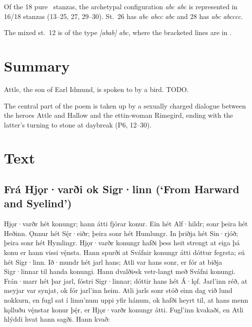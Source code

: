 Of the 18 pure \Ljodahattr\ stanzas, the archetypal configuration \emph{abc abc} is represented in 16/18 stanzas (13--25, 27, 29--30).  St.~26 has \emph{abc abcc abc} and 28 has \emph{abc abcccc}.

The mixed st.~12 is of the type \emph{[abab] abc}, where the bracketed lines are in \Fornyrdislag.

\section{Summary}

Attle, the son of Earl Idmund, is spoken to by a bird.  TODO.

The central part of the poem is taken up by a sexually charged dialogue between the heroes Attle and Hallow and the ettin-woman Rimegird, ending with the latter’s turning to stone at daybreak (P6, 12--30).

\sectionline

\newpage

\section{Text}

\subsection{Frá Hjǫr·varði ok Sigr·linn (‘From Harward and Syelind’)}

\bpg\bpa{}%
Hjǫr·varðr hét konungr; hann átti fjórar konur.  Ein hét Alf·hildr; sonr þeira hét Heðinn.  Ǫnnur hét Sę́r·eiðr; þeira sonr hét Humlungr.  In þriðja hét Sin·rjóð; þeira sonr hét Hymlingr.  Hjǫr·varðr konungr hafði þess heit strengt at eiga þá konu er hann vissi vę́nsta.  Hann spurði at Sváfnir konungr átti dóttur  fegrsta; sú hét Sigr·linn.  Ið·mundr hét jarl hans; Atli var hans sonr, er fór at biðja Sigr·linnar til handa konungi.  Hann dvalði⸗sk vetr-langt með Sváfni konungi.  Frán·marr hét þar jarl, fóstri Sigr·linnar; dóttir hans hét Á·lǫf.  Jarl’inn réð, at meyjar var synjat, ok fór jarl’inn heim.  Atli jarls sonr stóð einn dag við lund nokkurn, en fugl sat í limu’num uppi yfir hánum, ok hafði heyrt til, at hans menn kǫlluðu vę́nstar konur þę́r, er Hjǫr·varðr konungr átti.  Fugl’inn kvakaði, en Atli hlýddi hvat hann sagði. Hann kvað:\epa

